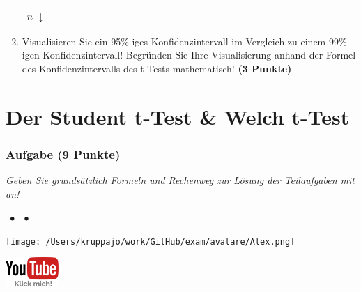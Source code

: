 \documentclass[a4paper, 9pt]{scrartcl}\usepackage[]{graphicx}\usepackage[]{xcolor}
\begin{document}
\begin{enumerate}
\begin{center}
\begin{tabular}[c]{l|c|c|c|l|c|c|c}
{                                                          $n\; \downarrow$} &
                                                                          \hspace{1.8cm}
                                                & \hspace{1.8cm}  & \hspace{1.8cm}\strut\\
    \hline
  \end{tabular}
\end{center}
\item Visualisieren Sie ein 95\%-iges Konfidenzintervall im Vergleich zu einem 99\%-igen Konfidenzintervall! Begründen Sie Ihre Visualisierung anhand der Formel des Konfidenzintervalls des t-Tests mathematisch! \textbf{(3 Punkte)} 
\end{enumerate} 
\clearpage
\part{Der Student t-Test \& Welch t-Test}

\section{Aufgabe \hfill (9 Punkte)}

\textit{Geben Sie grundsätzlich Formeln und Rechenweg zur Lösung der Teilaufgaben mit an!} \\[1Ex]
 

 
\ifcollection
\begin{flushright}
\tiny\vspace{-3Ex}
\textbf{\examinhaltstart}
\exammodulemathstat $\;\bullet$
\exammodulestat $\;\bullet$
\exammodulestatbbv 
\vspace{-4Ex}
\end{flushright}
\begin{minipage}[t]{0.5\textwidth}
\texttt{[image: /Users/kruppajo/work/GitHub/exam/avatare/Alex.png]}
\end{minipage}
\begin{minipage}[t]{0.5\textwidth}
\hfill
\href{https://youtu.be/eejS2uG4o-M}{\includegraphics[width = 2cm]{img/youtube}}
\end{minipage}
\vspace{-3ex}
\fi
\end{document}
